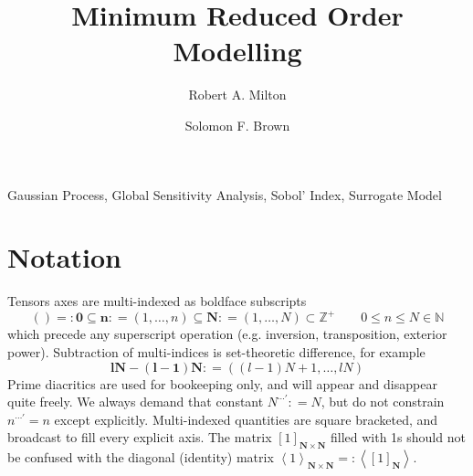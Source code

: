 \documentclass[preprint,12pt]{elsarticle}
\newcommand*{\M}[1]{\ensuremath{#1}\xspace}
\newcommand*{\x}{\times}
\newcommand*{\mi}[1]{\mathbf{#1}}
\newcommand*{\st}[1]{\mathbb{#1}}
\newcommand*{\te}[2][]{\left\lbrack{#2}\right\rbrack_{#1}}
\newcommand*{\diag}[2][]{\left\langle{#2}\right\rangle_{#1}}
\newcommand*{\deq}{\M{\mathrel{\mathop:}=}}
\newcommand*{\deqr}{\M{=\mathrel{\mathop:}}}
\begin{document}
    \begin{frontmatter}

        \title{Minimum  Reduced Order Modelling}

        \author{Robert A. Milton}

        \author{Solomon F. Brown}

        \address{Department of Chemical and Biological Engineering, University of Sheffield, Sheffield, S1 3JD, United Kingdom}       

        \begin{abstract}

        \end{abstract}

        \begin{keyword}
            Gaussian Process, Global Sensitivity Analysis, Sobol' Index, Surrogate Model
        \end{keyword}

    \end{frontmatter}


    \section{Notation} \label{sec:Notation}
        Tensors axes are multi-indexed as boldface subscripts 
        \begin{equation*}
            () \deqr \mi{0} \subseteq\mi{n} \deq(1,\ldots,n) \subseteq \mi{N}\deq(1,\ldots,N)\subset\st{Z}^{+} \qquad 0 \leq n \leq N \in \st{N}
        \end{equation*}
        which precede any superscript operation (e.g. inversion, transposition, exterior power).
        Subtraction of multi-indices is set-theoretic difference, for example
        \begin{equation*}
            \mi{lN}-\mi{(l-1)N} \deq ((l-1)N+1,\ldots,lN) 
        \end{equation*}
        Prime diacritics are used for bookeeping only, and will appear and disappear quite freely. We always demand that constant $N^{\cdots\prime} \deq N$, but do not constrain $n^{\cdots\prime} = n$ except explicitly. 
        Multi-indexed quantities are square bracketed, and broadcast to fill every explicit axis. The matrix $\te[\mi{N} \x \mi{N}]{1}$ filled with 1s should not be confused with the diagonal (identity) matrix $\diag[\mi{N}\x\mi{N}]{1} \deqr \diag{\te[\mi{N}]{1}}$. 
        
\end{document}
